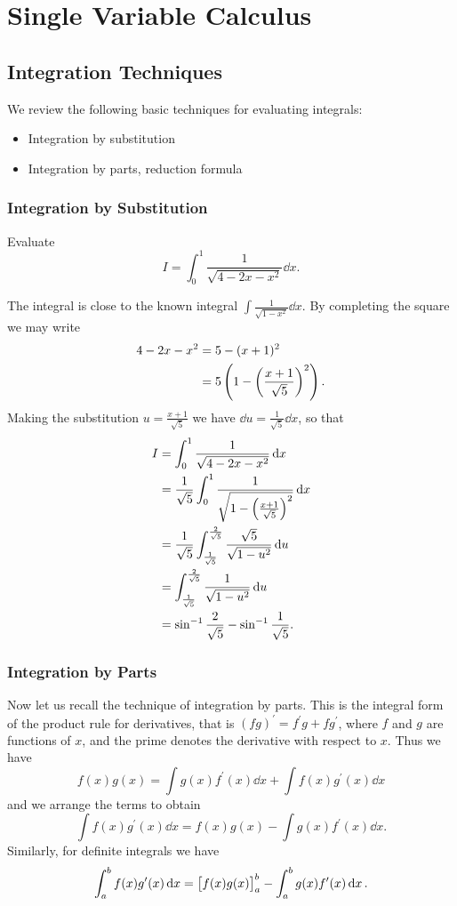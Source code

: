 \chapter{Single Variable Calculus}
\section{Integration Techniques}
We review the following basic techniques for evaluating integrals:
\begin{itemize}
\item Integration by substitution
\item Integration by parts, reduction formula
\end{itemize}

\subsection{Integration by Substitution}
\begin{exercise}
Evaluate
\[I=\int_{0}^{1}\frac{1}{\sqrt{4-2x-x^2}}\dd{x}.\]
\end{exercise}

\begin{solution}
The integral is close to the known integral $\int\frac{1}{\sqrt{1-x^2}}\dd{x}$. By completing the square we may write
\begin{align*}
4-2x-x^2&=5-(x+1)^2\\
&=5\left(1-\left(\frac{x+1}{\sqrt{5}}\right)^2\right).
\end{align*}
Making the substitution $u=\frac{x+1}{\sqrt{5}}$ we have $\dd{u}=\frac{1}{\sqrt{5}}\dd{x}$, so that
\begin{align*}
I&=\int_{0}^{1}\frac{1}{\sqrt{4-2x-x^2}}\dd{x}\\
&=\frac{1}{\sqrt{5}}\int_{0}^{1}\frac{1}{\sqrt{1-\left(\frac{x+1}{\sqrt{5}}\right)^2}}\dd{x}\\
&=\frac{1}{\sqrt{5}}\int_{\frac{1}{\sqrt{5}}}^{\frac{2}{\sqrt{5}}}\frac{\sqrt{5}}{\sqrt{1-u^2}}\dd{u}\\
&=\int_{\frac{1}{\sqrt{5}}}^{\frac{2}{\sqrt{5}}}\frac{1}{\sqrt{1-u^2}}\dd{u}\\
&=\sin^{-1}\frac{2}{\sqrt{5}}-\sin^{-1}\frac{1}{\sqrt{5}}.
\end{align*}
\end{solution}

\subsection{Integration by Parts}
Now let us recall the technique of integration by parts. This is the integral form of the product rule for derivatives, that is $(fg)^\prime=f^\prime g+fg^\prime$, where $f$ and $g$ are functions of $x$, and the prime denotes the derivative with respect to $x$. Thus we have
\[f(x)g(x)=\int g(x)f^\prime(x)\dd{x}+\int f(x)g^\prime(x)\dd{x}\]
and we arrange the terms to obtain
\[\int f(x)g^\prime(x)\dd{x}=f(x)g(x)-\int g(x)f^\prime(x)\dd{x}.\]
Similarly, for definite integrals we have
\[\int_{a}^{b}f(x)g^\prime(x)\dd{x}=\left[f(x)g(x)\right]_a^b-\int_{a}^{b}g(x)f^\prime(x)\dd{x}.\]

